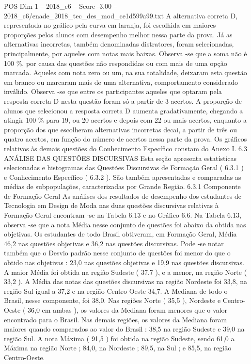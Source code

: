 \begin{textsample}{POS Dim 1 – 2018\_c6 – Score -3.00 – 2018\_c6/enade\_2018\_tec\_des\_mod\_ce1d599a99.txt}
A alternativa correta D, representada no gráfico pela curva em laranja, foi escolhida em maiores proporções pelos alunos com desempenho melhor nessa parte da prova.
Já as alternativas incorretas, também denominadas distratores, foram selecionadas, principalmente, por aqueles com notas mais baixas.
Observa -se que a soma não é 100 \%, por causa das questões não respondidas ou com mais de uma opção marcada.
Aqueles com nota zero ou um, na sua totalidade, deixaram esta questão em branco ou marcaram mais de uma alternativa, comportamento considerado inválido.
Observa -se que entre os participantes aqueles que optaram pela resposta correta D nesta questão foram só a partir de 3 acertos.
A proporção de alunos que selecionou a resposta correta D aumenta gradativamente, chegando a atingir 100 \% para 19, ou 20 acertos e depois com 22 ou mais acertos, enquanto a proporção dos que escolheram alternativas incorretas decai, a partir de três ou quatro acertos, em função do número de acertos nessa parte da prova.
Os gráficos relativos às demais questões do Conhecimento Específico constam do Anexo I. 6.3 ANÁLISE DAS QUESTÕES DISCURSIVAS Esta seção apresenta estatísticas selecionadas e histogramas das Questões Discursivas de Formação Geral ( 6.3.1 ) e Conhecimento Específico ( 6.3.2 ).
São também apresentadas e comparadas as médias de subpopulações, caracterizadas por Grande Região. 6.3.1 Componente de Formação Geral As análises dos resultados de desempenho dos estudantes de Tecnologia em Design de Moda nas duas questões discursivas relativas à Formação Geral encontram -se na Tabela 6.13 e no Gráfico 6.6.
Na Tabela 6.13, observa -se que a nota Média nesse conjunto de questões foi abaixo da obtida nas objetivas.
Os estudantes de todo Brasil obtiveram, em Formação Geral, Média 46,2 nas questões objetivas e 36,2 nas questões discursivas.
Pode -se notar também que o Desvio padrão nesse conjunto de questões foi menor do que o obtido nas objetivas : 23,0 nas questões objetivas e 19,9 nas questões discursivas.
A maior Média foi obtida na região Sudeste ( 37,7 ), e a menor, na região Norte ( 33,2 ).
A Média das notas das questões discursivas na região Nordeste foi 33,8, na região Sul igual a 37,2 e na região Centro-Oeste 34,7.
A Mediana de todo o Brasil, nesse componente, foi 38,0.
Nas regiões Norte ( 35,5 ), Nordeste e Centro-Oeste ( 36,0 em ambas ), os valores da Mediana foram menores que o valor encontrado para o Brasil.
Nas demais regiões, os valores da Mediana foram maiores quando comparados ao valor do Brasil : 38,5 na região Sudeste e 39,0 na região Sul.
A nota Máxima ( 91,5 ) foi obtida na região Sudeste, sendo 61,0 a Máxima na região Norte ; 84,0, na Nordeste ; 89,5, na Sul ; e 85,5, na região Centro-Oeste.

\end{textsample}
